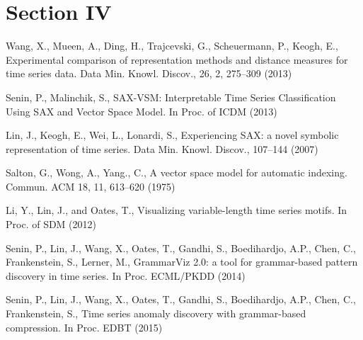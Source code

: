 \documentclass{llncs}
\begin{document}
\section{Section IV}

\begin{thebibliography}{3}

Wang, X., Mueen, A., Ding, H., Trajcevski, G., Scheuermann, P., Keogh, E.,
Experimental comparison of representation methods and distance measures for time series data.
Data Min. Knowl. Discov., 26, 2, 275--309 (2013)

Senin, P., Malinchik, S.,
{SAX-VSM}: Interpretable Time Series Classification Using {SAX} and {Vector Space Model}.
In Proc. of ICDM (2013) 

Lin, J., Keogh, E., Wei, L., Lonardi, S.,
Experiencing SAX: a novel symbolic representation of time series.
Data Min. Knowl. Discov., 107--144 (2007)

Salton, G., Wong, A., Yang., C.,
A vector space model for automatic indexing.
Commun. ACM 18, 11, 613--620 (1975)

Li, Y., Lin, J., and Oates, T.,
Visualizing variable-length time series motifs.
In Proc. of SDM (2012)

Senin, P., Lin, J., Wang, X., Oates, T., Gandhi, S., Boedihardjo, A.P., Chen, C., Frankenstein, S., Lerner, M.,
GrammarViz 2.0: a tool for grammar-based pattern discovery in time series.
In Proc. ECML/PKDD (2014)

Senin, P., Lin, J., Wang, X., Oates, T., Gandhi, S., Boedihardjo, A.P., Chen, C., Frankenstein, S.,
Time series anomaly discovery with grammar-based compression.
In Proc. EDBT (2015)

\end{thebibliography}
\end{document}
